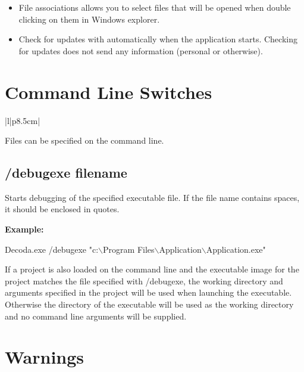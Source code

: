 \begin{itemize}
\item File associations allows you to select files that will be opened when double clicking
on them in Windows explorer.
\item Check for updates with automatically when the application starts. Checking for updates
does not send any information (personal or otherwise).
\end{itemize}

\chapter{Command Line Switches}\label{command_line}
%
%
\setfooter{\thepage}{}{}{}{}{\thepage}%


\begin{tabular}{|l|p{8.5cm}|}\hline
{}\hline\hline
{}
\end{tabular}

Files can be specified on the command line.

\section*{/debugexe filename}\label{debugexe}

Starts debugging of the specified executable file. If the file name contains spaces, it should
be enclosed in quotes.

\textbf{Example:}

Decoda.exe /debugexe "c:$\backslash$Program Files$\backslash$Application$\backslash$Application.exe"

If a project is also loaded on the command line and the executable image for the project
matches the file specified with /debugexe, the working directory and arguments specified
in the project will be used when launching the executable. Otherwise the directory of the
executable will be used as the working directory and no command line arguments will be
supplied.

\chapter{Warnings}\label{warnings}

